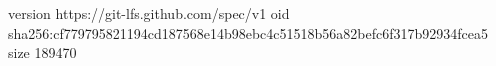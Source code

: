 version https://git-lfs.github.com/spec/v1
oid sha256:cf779795821194cd187568e14b98ebc4c51518b56a82befc6f317b92934fcea5
size 189470
